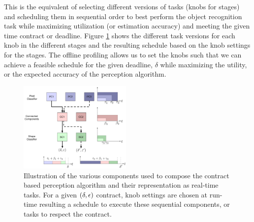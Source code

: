 
This is the equivalent of selecting different versions of tasks (knobs for stages) and scheduling them in sequential order to best perform the object recognition task while maximizing utilization (or estimation accuracy) and meeting the given time contract or deadline. Figure \ref{fig:RT_bs} shows the different task versions for each knob in the different stages and the resulting schedule based on the knob settings for the stages. The offline profiling allows us to set the knobs such that we can achieve a feasible schedule for the given deadline, $\delta$ while maximizing the utility, or the expected accuracy of the perception algorithm. 


\begin{figure}[htbp]
  \centering
  \includegraphics[width=0.49\textwidth]{figures/omnigraffle_figures/real_time_figure}
  \caption{Illustration of the various components used to compose the contract based perception algorithm and their representation as real-time tasks. For a given $(\delta,\epsilon)$ contract, knob settings are chosen at run-time resulting a schedule to execute these sequential components, or tasks to respect the contract.}
  \label{fig:RT_bs}
\end{figure}




